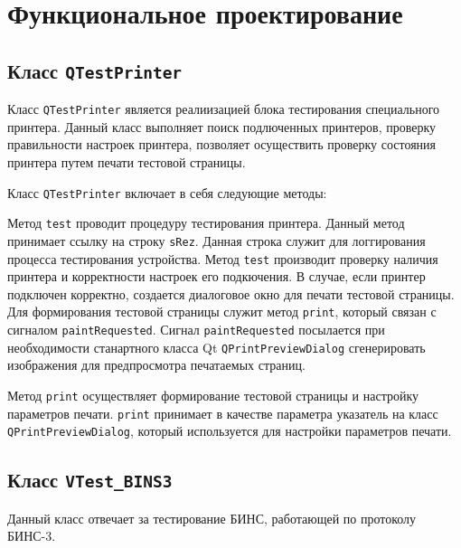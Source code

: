 \section{Функциональное проектирование}
\label{sec:func}

\subsection{Класс \texttt{QTestPrinter}}
Класс \texttt{QTestPrinter} является реалиизацией блока тестирования специального принтера.
Данный класс выполняет поиск подлюченных принтеров, проверку правильности настроек принтера,
позволяет осуществить проверку состояния принтера путем печати тестовой страницы.

Класс \texttt{QTestPrinter} включает в себя следующие методы:

\begin{enum}
	\item Метод \texttt{test} проводит процедуру тестирования принтера. Данный метод принимает ссылку на строку
		\texttt{sRez}. Данная строка служит для логгирования процесса тестирования устройства. Метод \texttt{test} производит
		проверку наличия принтера и корректности настроек его подкючения. В случае, если принтер подключен корректно, создается
		диалоговое окно для печати тестовой страницы. Для формирования тестовой страницы служит метод \texttt{print}, который
		связан с сигналом \texttt{paintRequested}. Сигнал \texttt{paintRequested} посылается при необходимости станартного
		класса Qt \texttt{QPrintPreviewDialog} сгенерировать изображения для предпросмотра печатаемых страниц.

	\item Метод \texttt{print} осуществляет формирование тестовой страницы и настройку параметров печати. \texttt{print}
		принимает в качестве параметра указатель на класс \texttt{QPrintPreviewDialog}, который используется для настройки
		параметров печати.
\end{enum}

\subsection{Класс \texttt{VTest\_BINS3}}
Данный класс отвечает за тестирование БИНС, работающей по протоколу БИНС-3.


